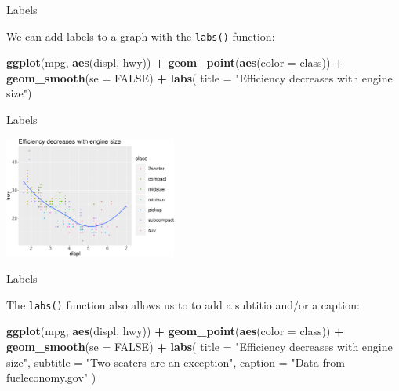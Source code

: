\documentclass[ignorenonframetext,]{beamer}
\newenvironment{Shaded}{\begin{snugshade}}{\end{snugshade}}
\newcommand{\DataTypeTok}[1]{\textcolor[rgb]{0.13,0.29,0.53}{#1}}
\newcommand{\KeywordTok}[1]{\textcolor[rgb]{0.13,0.29,0.53}{\textbf{#1}}}
\newcommand{\NormalTok}[1]{#1}
\newcommand{\OperatorTok}[1]{\textcolor[rgb]{0.81,0.36,0.00}{\textbf{#1}}}
\newcommand{\OtherTok}[1]{\textcolor[rgb]{0.56,0.35,0.01}{#1}}
\newcommand{\StringTok}[1]{\textcolor[rgb]{0.31,0.60,0.02}{#1}}
\begin{document}
\begin{frame}[fragile]{Labels}
\protect\hypertarget{labels}{}

We can add labels to a graph with the \texttt{labs()} function:

\begin{Shaded}
\begin{Highlighting}[]
\KeywordTok{ggplot}\NormalTok{(mpg, }\KeywordTok{aes}\NormalTok{(displ, hwy)) }\OperatorTok{+}
\StringTok{  }\KeywordTok{geom_point}\NormalTok{(}\KeywordTok{aes}\NormalTok{(}\DataTypeTok{color =}\NormalTok{ class)) }\OperatorTok{+}
\StringTok{  }\KeywordTok{geom_smooth}\NormalTok{(}\DataTypeTok{se =} \OtherTok{FALSE}\NormalTok{) }\OperatorTok{+}
\StringTok{  }\KeywordTok{labs}\NormalTok{(}
    \DataTypeTok{title =} \StringTok{"Efficiency decreases with engine size"}\NormalTok{)}
\end{Highlighting}
\end{Shaded}

\end{frame}

\begin{frame}{Labels}
\protect\hypertarget{labels-1}{}

\begin{center}\includegraphics[height=150px]{data-visualization_files/figure-beamer/unnamed-chunk-148-1} \end{center}

\end{frame}

\begin{frame}[fragile]{Labels}
\protect\hypertarget{labels-2}{}

The \texttt{labs()} function also allows us to to add a subtitio and/or
a caption:

\begin{Shaded}
\begin{Highlighting}[]
\KeywordTok{ggplot}\NormalTok{(mpg, }\KeywordTok{aes}\NormalTok{(displ, hwy)) }\OperatorTok{+}
\StringTok{  }\KeywordTok{geom_point}\NormalTok{(}\KeywordTok{aes}\NormalTok{(}\DataTypeTok{color =}\NormalTok{ class)) }\OperatorTok{+}
\StringTok{  }\KeywordTok{geom_smooth}\NormalTok{(}\DataTypeTok{se =} \OtherTok{FALSE}\NormalTok{) }\OperatorTok{+}
\StringTok{  }\KeywordTok{labs}\NormalTok{(}
    \DataTypeTok{title =} \StringTok{"Efficiency decreases with engine size"}\NormalTok{,}
    \DataTypeTok{subtitle =} \StringTok{"Two seaters are an exception"}\NormalTok{,}
    \DataTypeTok{caption =} \StringTok{"Data from fueleconomy.gov"}
\NormalTok{  )}
\end{Highlighting}
\end{Shaded}

\end{frame}
\end{document}

